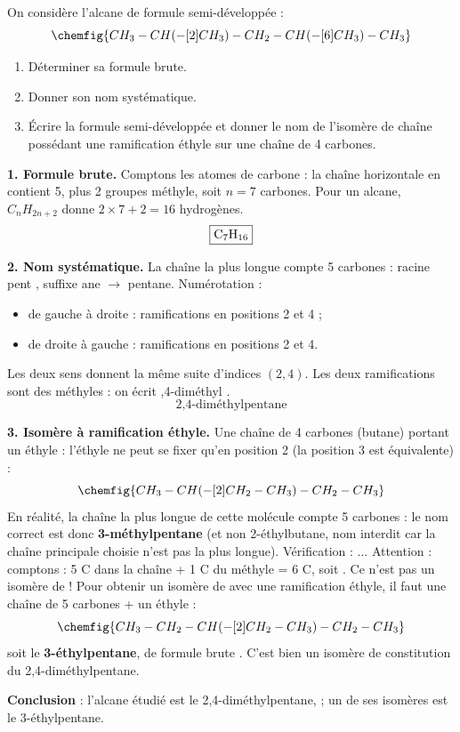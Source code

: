 \documentclass[11pt]{article}
\begin{document}
\begin{exoresolu}
On considère l'alcane de formule semi-développée :
\[ \chemfig{CH_3-CH(-[2]CH_3)-CH_2-CH(-[6]CH_3)-CH_3} \]
\begin{enumerate}
\item Déterminer sa formule brute.
\item Donner son nom systématique.
\item Écrire la formule semi-développée et donner le nom de l'isomère de chaîne possédant une ramification éthyle sur une chaîne de 4 carbones.
\end{enumerate}
\tcblower
\textbf{1. Formule brute.} Comptons les atomes de carbone : la chaîne horizontale en contient 5, plus 2 groupes méthyle, soit $n = 7$ carbones. Pour un alcane, $C_nH_{2n+2}$ donne $2 \times 7 + 2 = 16$ hydrogènes.
\[ \boxed{\ce{C7H16}} \]

\textbf{2. Nom systématique.} La chaîne la plus longue compte 5 carbones : racine \og pent \fg{}, suffixe \og ane \fg{} $\rightarrow$ pentane. Numérotation :
\begin{itemize}
\item de gauche à droite : ramifications en positions 2 et 4 ;
\item de droite à gauche : ramifications en positions 2 et 4.
\end{itemize}
Les deux sens donnent la même suite d'indices $(2,4)$. Les deux ramifications sont des méthyles : on écrit ,4-diméthyl \fg{}.
\[ \boxed{\text{2,4-diméthylpentane}} \]

\textbf{3. Isomère à ramification éthyle.} Une chaîne de 4 carbones (butane) portant un éthyle  : l'éthyle ne peut se fixer qu'en position 2 (la position 3 est équivalente) :
\[ \chemfig{CH_3-CH(-[2]CH_2-CH_3)-CH_2-CH_3} \]
En réalité, la chaîne la plus longue de cette molécule compte 5 carbones : le nom correct est donc \textbf{3-méthylpentane} (et non 2-éthylbutane, nom interdit car la chaîne principale choisie n'est pas la plus longue). Vérification : ... Attention : comptons : 5 C dans la chaîne + 1 C du méthyle = 6 C, soit . Ce n'est pas un isomère de  ! Pour obtenir un isomère de  avec une ramification éthyle, il faut une chaîne de 5 carbones + un éthyle :
\[ \chemfig{CH_3-CH_2-CH(-[2]CH_2-CH_3)-CH_2-CH_3} \]
soit le \textbf{3-éthylpentane}, de formule brute . C'est bien un isomère de constitution du 2,4-diméthylpentane.

\textbf{Conclusion} : l'alcane étudié est le 2,4-diméthylpentane,  ; un de ses isomères est le 3-éthylpentane.
\end{exoresolu}
\end{document}
